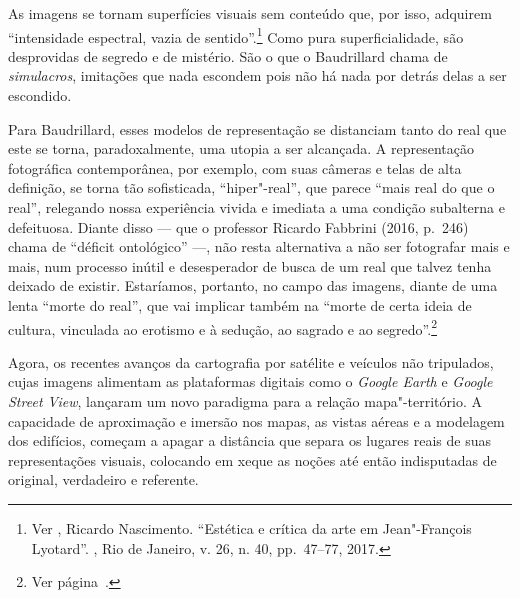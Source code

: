 As imagens se tornam superfícies visuais sem conteúdo que, por isso,
adquirem ``intensidade espectral, vazia de sentido''.\footnote{Ver
  , Ricardo Nascimento. ``Estética e crítica da arte em
  Jean"-François Lyotard''. {}, Rio de Janeiro, v. 26, n. 40, pp.~47--77, 2017.}
Como pura superficialidade, são desprovidas de segredo e de mistério.
São o que o Baudrillard chama de \emph{simulacros}, imitações que nada \label{simulacros}
escondem pois não há nada por detrás delas a ser escondido.

Para Baudrillard, esses modelos de representação se distanciam tanto do
real que este se torna, paradoxalmente, uma utopia a ser alcançada. A
representação fotográfica contemporânea, por exemplo, com suas câmeras e
telas de alta definição, se torna tão sofisticada, ``hiper"-real'', que \label{hiperreal}
parece ``mais real do que o real'', relegando nossa experiência vivida e
imediata a uma condição subalterna e defeituosa. Diante disso --- que o
professor Ricardo Fabbrini (2016, p.~246) chama de ``déficit ontológico'' ---, não resta \label{deficit}
alternativa a não ser fotografar mais e mais, num processo inútil e
desesperador de busca de um real que talvez tenha deixado de existir.
Estaríamos, portanto, no campo das imagens, diante de uma lenta ``morte
do real'', que vai implicar também na ``morte de certa ideia de cultura,
vinculada ao erotismo e à sedução, ao sagrado e ao segredo''.\footnote{Ver página~\pageref{compulsiva}.}

Agora, os recentes avanços da cartografia por satélite e veículos não
tripulados, cujas imagens alimentam as plataformas digitais como o
\emph{Google Earth} e \emph{Google Street View}, lançaram um novo
paradigma para a relação mapa"-território. A capacidade de aproximação e
imersão nos mapas, as vistas aéreas e a modelagem  dos edifícios,
começam a apagar a distância que separa os lugares reais de suas
representações visuais, colocando em xeque as noções até então
indisputadas de original, verdadeiro e referente.

